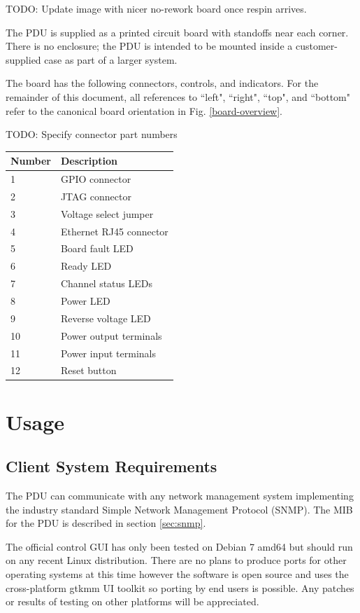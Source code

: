 \documentclass{article}
\begin{document}
TODO: Update image with nicer no-rework board once respin arrives.

The PDU is supplied as a printed circuit board with standoffs near each corner. There is no enclosure; the PDU is 
intended to be mounted inside a customer-supplied case as part of a larger system.

The board has the following connectors, controls, and indicators. For the remainder of this document, all references 
to ``left", ``right", ``top", and ``bottom" refer to the canonical board orientation in Fig. \ref{board-overview}.

TODO: Specify connector part numbers

\begin{longtable}{|l|p{4in}|}
\hline
{\bf Number} & {\bf Description}\\
\hline
1 & GPIO connector\\
\hline
2 & JTAG connector\\
\hline
3 & Voltage select jumper\\
\hline
4 & Ethernet RJ45 connector \\
\hline
5 & Board fault LED\\
\hline
6 & Ready LED\\
\hline
7 & Channel status LEDs\\
\hline
8 & Power LED\\
\hline
9 & Reverse voltage LED\\
\hline
10 & Power output terminals\\
\hline
11 & Power input terminals\\
\hline
12 & Reset button\\
\hline
\end{longtable}

\pagebreak
\section{Usage}

\subsection{Client System Requirements}

The PDU can communicate with any network management system implementing the industry standard Simple Network 
Management Protocol (SNMP). The MIB for the PDU is described in section \ref{sec:snmp}.

The official control GUI has only been tested on Debian 7 amd64 but should run on any recent Linux distribution. 
There are no plans to produce ports for other operating systems at this time however the software is open source and 
uses the cross-platform gtkmm UI toolkit so porting by end users is possible. Any patches or results of testing on 
other platforms will be appreciated.
\end{document}
